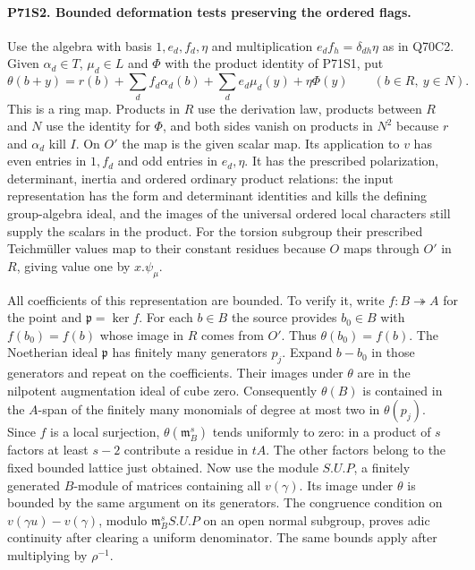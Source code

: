 \paragraph{P71S2. Bounded deformation tests preserving the ordered flags.}
Use the algebra with basis $1,e_d,f_d,\eta$ and multiplication
$e_d f_h=\delta_{dh}\eta$ as in Q70C2. Given $\alpha_d\in T$,
$\mu_d\in L$ and $\Phi$ with the product identity of P71S1, put
\[
 \theta(b+y)=r(b)+\sum_d f_d\alpha_d(b)+\sum_d e_d\mu_d(y)
                    +\eta\Phi(y) \qquad(b\in R,~y\in N).
\]
This is a ring map. Products in $R$ use the derivation law,
products between $R$ and $N$ use the identity for $\Phi$, and
both sides vanish on products in $N^2$ because $r$ and
$\alpha_d$ kill $I$. On $O'$ the map is the given scalar map.
Its application to $v$ has even entries in $1,f_d$ and odd
entries in $e_d,\eta$. It has the prescribed polarization,
determinant, inertia and ordered ordinary product relations:
the input representation has the form and determinant identities
and kills the defining group-algebra ideal, and the images of
the universal ordered local characters still supply the scalars
in the product. For the torsion subgroup their prescribed Teichmüller
values map to their constant residues because $O$ maps through
$O'$ in $R$, giving value one by $x.\psi_\mu$.

All coefficients of this representation are bounded. To verify it,
write $f:B\twoheadrightarrow A$ for the point and
$\mathfrak p=\ker f$. For each $b\in B$ the source provides
$b_0\in B$ with $f(b_0)=f(b)$ whose image in $R$ comes from
$O'$. Thus $\theta(b_0)=f(b)$. The Noetherian ideal
$\mathfrak p$ has finitely many generators $p_j$. Expand
$b-b_0$ in those generators and repeat on the coefficients.
Their images under $\theta$ are in the nilpotent augmentation
ideal of cube zero. Consequently $\theta(B)$ is contained in
the $A$-span of the finitely many monomials of degree at most two
in $\theta(p_j)$. Since $f$ is a local surjection,
$\theta(\mathfrak m_B^s)$ tends uniformly to zero: in a product of
$s$ factors at least $s-2$ contribute a residue in $tA$. The
other factors belong to the fixed bounded lattice just obtained.
Now use the module $S.U.P$, a finitely generated
$B$-module of matrices containing all $v(\gamma)$. Its image
under $\theta$ is bounded by the same argument on its generators.
The congruence condition on $v(\gamma u)-v(\gamma)$, modulo
$\mathfrak m_B^s S.U.P$ on an open normal subgroup, proves
adic continuity after clearing a uniform denominator. The same
bounds apply after multiplying by $\rho^{-1}$.

